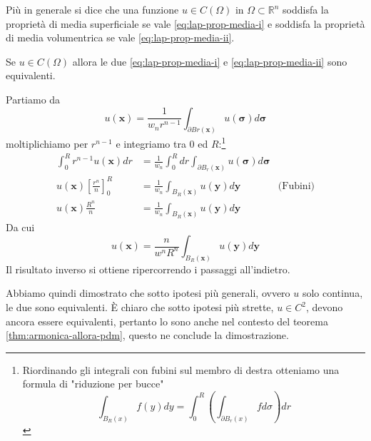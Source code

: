 \documentclass[10pt,a4paper,twoside,openright]{book}
\newcommand{\x}{\mathbf{x}}
\newcommand{\y}{\mathbf{y}}
\begin{document}
\begin{definition}[PDM]
	Più in generale si dice che una funzione $u\in C( \Omega )$ in $\Omega \subset \mathbb{R}^{n}$ soddisfa la proprietà di media superficiale se vale \eqref{eq:lap-prop-media-i} e soddisfa la proprietà di media volumentrica se vale \eqref{eq:lap-prop-media-ii}.
\end{definition}
\begin{theorem}
	Se $u\in C( \Omega )$ allora le due \eqref{eq:lap-prop-media-i} e \eqref{eq:lap-prop-media-ii} sono equivalenti.
\end{theorem}
\begin{dimostrazione}
	Partiamo da
	\begin{equation*}
		u(\x) =\frac{1}{w_{n} r^{n-1}}\int _{\partial Br(\x)} u(\bm{\sigma }) d\bm{\sigma }
	\end{equation*}
	moltiplichiamo per $r^{n-1}$ e integriamo tra $0$ ed $R$:\footnote{Riordinando gli integrali con fubini sul membro di destra otteniamo una formula di "riduzione per bucce" 
	\begin{equation*}
		\int _{B_{R}( x)} f( y) dy=\int _{0}^{R}\left(\int _{\partial B_{r}( x)} fd\sigma \right) dr
	\end{equation*}
	}
	\begin{align*}
		\int _{0}^{R} r^{n-1} u(\x) dr & =\frac{1}{w_{n}}\int _{0}^{R} dr\int _{\partial B_{r}(\x)} u(\bm{\sigma }) d\bm{\sigma } & \\
		u(\x)\left[\frac{r^{n}}{n}\right]_{0}^{R} & =\frac{1}{w_{n}}\int _{B_{R}(\x)} u(\y) d\y & \text{(Fubini)}\\
		u(\x)\frac{R^{n}}{n} & =\frac{1}{w_{n}}\int _{B_{R}(\x)} u(\y) d\y & 
	\end{align*}
	Da cui 
	\begin{equation*}
		u(\x) =\frac{n}{w^{n} R^{n}}\int _{B_{R}(\x)} u(\y) d\y
	\end{equation*}
	Il risultato inverso si ottiene ripercorrendo i passaggi all'indietro.
\end{dimostrazione}
Abbiamo quindi dimostrato che sotto ipotesi più generali, ovvero $u$ solo continua, le due sono equivalenti. È chiaro che sotto ipotesi più strette, $u\in C^{2}$, devono ancora essere equivalenti, pertanto lo sono anche nel contesto del teorema \ref{thm:armonica-allora-pdm}, questo ne conclude la dimostrazione.
\end{document}
